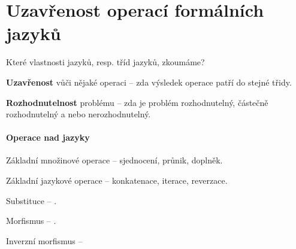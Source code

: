 
\section{Uzavřenost operací formálních jazyků}

\begin{compactitem}
    \item Které vlastnosti jazyků, resp. tříd jazyků, zkoumáme? \begin{compactitem}
        \item \textbf{Uzavřenost} vůči nějaké operaci -- zda výsledek operace patří do stejné třidy.

        \item \textbf{Rozhodnutelnost} problému -- zda je problém rozhodnutelný, částečně rozhodnutelný a nebo nerozhodnutelný.
    \end{compactitem}
\end{compactitem}

\paragraph*{Operace nad jazyky} \begin{compactitem}
    \item Základní množinové operace -- sjednocení, průnik, doplněk.

    \item Základní jazykové operace -- konkatenace, iterace, reverzace.

    \item Substituce -- .

    \item Morfismus -- .

    \item Inverzní morfismus -- 
\end{compactitem}

